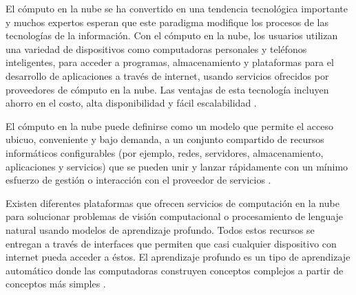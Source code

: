 

El cómputo en la nube se ha convertido en una
tendencia tecnológica importante y muchos
expertos esperan que este paradigma 
modifique los procesos de las tecnologías de
la información. Con el cómputo en la nube, los usuarios 
 utilizan una variedad de dispositivos como 
 computadoras personales y teléfonos inteligentes,
 para acceder a programas, almacenamiento y plataformas
 para el desarrollo de aplicaciones a través de internet,
 usando servicios ofrecidos por proveedores de cómputo
 en la nube. Las ventajas de esta tecnología 
 incluyen ahorro en el costo, alta disponibilidad y fácil
 escalabilidad \cite{borkofurhtarmandoescalante2010}.
 
 
El cómputo en la nube puede definirse como un modelo 
que permite el acceso ubicuo, conveniente y bajo demanda, 
a un conjunto compartido de recursos informáticos 
configurables (por ejemplo, redes, servidores, 
almacenamiento, aplicaciones y servicios) que se pueden 
unir y lanzar rápidamente con un mínimo esfuerzo de 
gestión o interacción con el proveedor de servicios \cite{mell_peter_tim_2011}.


Existen diferentes plataformas que 
ofrecen servicios
de computación en la nube para solucionar problemas de 
visión computacional \cite{googlevision2018} o
procesamiento de lenguaje natural \cite{witaidocs2018} usando modelos
de aprendizaje profundo. 
Todos estos recursos se entregan a través de 
interfaces que
permiten que casi cualquier dispositivo con 
internet
pueda acceder a éstos.
El aprendizaje profundo es un 
tipo
de aprendizaje automático donde las computadoras 
construyen
conceptos complejos a partir de conceptos más 
simples \cite{iangoodfellowyoshuabengioaaroncourville2017}.

